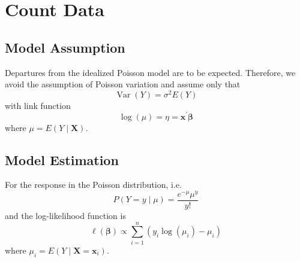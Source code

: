 \chapter{Count Data}

\section{Model Assumption}

Departures from the idealized Poisson model are to be expected. Therefore, we avoid the assumption of Poisson variation and assume only that
\begin{equation}
    \operatorname{Var}\left(Y\right)=\sigma^{2}E\left(Y\right)
\end{equation}
with link function
\begin{equation}
    \log\left(\mu\right)=\eta=\mathbf{x}^{\prime}\boldsymbol{\beta}
\end{equation}
where $\mu=E\left(Y\mid\mathbf{X}\right)$.

\section{Model Estimation}

For the response in the Poisson distribution, i.e.
\begin{equation*}
    P(Y=y\mid\mu)=\frac{e^{-\mu}\mu^{y}}{y!}
\end{equation*}
and the log-likelihood function is
\begin{equation}
    \ell\left(\boldsymbol{\beta}\right)\propto\sum_{i=1}^{n}\left(y_{i} \log\left(\mu_{i}\right)-\mu_{i}\right)
\end{equation}
where $\mu_{i}=E\left(Y\mid\mathbf{X}=\mathbf{x}_{i}\right)$.

